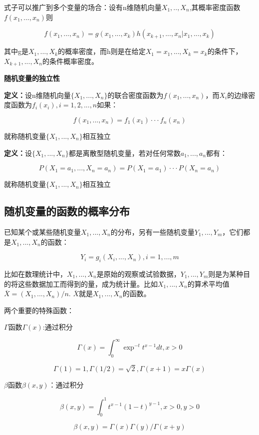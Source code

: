 \documentclass{ctexart}
\begin{document}
	式子可以推广到多个变量的场合：设有n维随机向量\(X_1,..,X_n\),其概率密度函数\(f(x_1,...,x_n)\)则
	
	\[f(x_1,...,x_n)=g(x_1,...,x_k)h(x_{k+1},...,x_n|x_1,...,x_k)\]
	
	其中g是\(X_1,...,X_k\)的概率密度，而h则是在给定\(X_1=x_1,...,X_k=x_k\)的条件下，\(X_{k+1},...,X_n\)的条件概率密度。
	
	\mbox{}
	
	\textbf{随机变量的独立性}
	
	\textbf{定义：}设n维随机向量\(\{X_1,...,X_n\}\)的联合密度函数为\(f(x_1,...,x_n)\)，而\(X_i\)的边缘密度函数为\(f_i(x_i),i=1,2,...,n\)如果：
	
	\[f(x_1,...,x_n)=f_1(x_1)···f_n(x_n)\]
	
	就称随机变量\(\{X_1,...,X_n\}\)相互独立
	
	\mbox{}
	
	\textbf{定义：}设\(\{X_1,...,X_n\}\)都是离散型随机变量，若对任何常数\(a_1,...,a_n\)都有：
	
	\[P(X_1=a_1,...,X_n=a_n)=P(X_1=a_1)···P(X_n=a_n)\]
	
	就称随机变量\(\{X_1,...,X_n\}\)相互独立
	
	\subsection{随机变量的函数的概率分布}
	
	已知某个或某些随机变量\(X_1,...,X_n\)的分布，另有一些随机变量\(Y_1,...,Y_m\)，它们都是\(X_1,...,X_n\)的函数：
	
	\[Y_i=g_i(X_i,...,X_n),i=1,...,m\]
	
	比如在数理统计中，\(X_1,...,X_n\)是原始的观察或试验数据，\(Y_1,...,Y_m\)则是为某种目的将这些数据加工而得到的量，成为统计量。比如\(X_1,...,X_n\)的算术平均值\(\overline{X}=(X_1,...,X_n)/n\). \(\overline{X}\)就是\(X_1,...,X_n\)的函数。
	
	两个重要的特殊函数：
	
	\(\Gamma\)函数\(\Gamma(x)\):通过积分
	
	\[\Gamma(x)=\int_{0}^{\infty}\exp^{-t}t^{x-1}dt, x > 0\]
	
	\[\Gamma(1)=1, \Gamma(1/2)=\sqrt{2}, \Gamma(x+1)=x\Gamma(x)\]
	
	\(\beta\)函数\(\beta(x,y)\)：通过积分
	
	\[\beta(x,y)=\int_{0}^{1}t^{x-1}(1-t)^{y-1}, x > 0, y > 0\]
	
	\[\beta(x,y)=\Gamma(x)\Gamma(y)/\Gamma(x+y)\]
	
\end{document}
